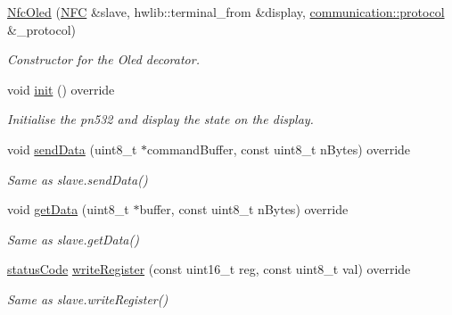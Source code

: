 \begin{DoxyCompactItemize}
\item 
\hyperlink{classnfc_1_1NfcOled_ab3917823345cbb6bc0881fa04d84a6cb}{Nfc\+Oled} (\hyperlink{classnfc_1_1NFC}{N\+FC} \&slave, hwlib\+::terminal\+\_\+from \&display, \hyperlink{classcommunication_1_1protocol}{communication\+::protocol} \&\+\_\+protocol)
\begin{DoxyCompactList}\small\item\em Constructor for the Oled decorator. \end{DoxyCompactList}\item 
\mbox{\label{classnfc_1_1NfcOled_a2b394a955afe3f280e3f2509908effe9}} 
void \hyperlink{classnfc_1_1NfcOled_a2b394a955afe3f280e3f2509908effe9}{init} () override
\begin{DoxyCompactList}\small\item\em Initialise the pn532 and display the state on the display. \end{DoxyCompactList}\item 
\mbox{\label{classnfc_1_1NfcOled_aa969ac754435a695ce1ddb8c4285e76c}} 
void \hyperlink{classnfc_1_1NfcOled_aa969ac754435a695ce1ddb8c4285e76c}{send\+Data} (uint8\+\_\+t $\ast$command\+Buffer, const uint8\+\_\+t n\+Bytes) override
\begin{DoxyCompactList}\small\item\em Same as slave.\+send\+Data() \end{DoxyCompactList}\item 
\mbox{\label{classnfc_1_1NfcOled_a4f9564fbbc2981031fbfbf50be308745}} 
void \hyperlink{classnfc_1_1NfcOled_a4f9564fbbc2981031fbfbf50be308745}{get\+Data} (uint8\+\_\+t $\ast$buffer, const uint8\+\_\+t n\+Bytes) override
\begin{DoxyCompactList}\small\item\em Same as slave.\+get\+Data() \end{DoxyCompactList}\item 
\mbox{\label{classnfc_1_1NfcOled_a8782a26a35cb2b412621b580cc58eec4}} 
\hyperlink{declarations_8h_ae1d20c5a38cae82ccaa6a77be3fd264b}{status\+Code} \hyperlink{classnfc_1_1NfcOled_a8782a26a35cb2b412621b580cc58eec4}{write\+Register} (const uint16\+\_\+t reg, const uint8\+\_\+t val) override
\begin{DoxyCompactList}\small\item\em Same as slave.\+write\+Register() \end{DoxyCompactList}\item 

\end{DoxyCompactItemize}
